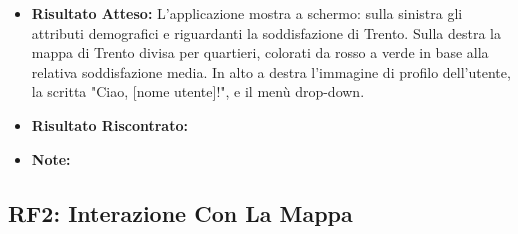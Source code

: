\begin{itemize}
\begin{itemize}
                    \item \textbf{Risultato Atteso:} L'applicazione mostra a schermo:  sulla sinistra gli attributi demografici e riguardanti la soddisfazione di Trento. Sulla destra la mappa di Trento divisa per quartieri, colorati da rosso a verde in base alla relativa soddisfazione media. In alto a destra l'immagine di profilo dell'utente, la scritta "Ciao, [nome utente]!", e il menù drop-down.
                    \item \textbf{Risultato Riscontrato:}
                    \item \textbf{Note:}
                \end{itemize}
        \end{itemize}


    \subsection{RF2: Interazione Con La Mappa}
